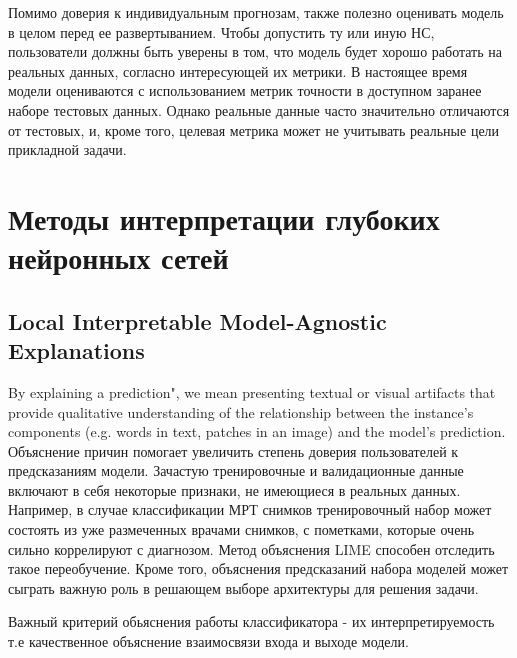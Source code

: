 \documentclass[oneside,final,14pt]{extreport}
\begin{document}
Помимо доверия к индивидуальным прогнозам, также полезно оценивать модель в целом перед ее развертыванием. Чтобы допустить ту или иную НС, пользователи должны быть уверены в том, что модель будет хорошо работать на реальных данных, согласно интересующей их метрики. В настоящее время модели оцениваются с использованием метрик точности в доступном заранее наборе тестовых данных. Однако реальные данные часто значительно отличаются от тестовых, и, кроме того, целевая метрика может не учитывать реальные цели прикладной задачи.
\section{Методы интерпретации глубоких нейронных сетей}
\subsection{Local Interpretable Model-Agnostic Explanations}
By explaining a prediction", we mean presenting textual or visual artifacts that provide qualitative understanding of the relationship between the instance’s components (e.g. words in text, patches in an image) and the model’s prediction. Объяснение причин помогает увеличить степень доверия пользователей к предсказаниям модели. Зачастую тренировочные и валидационные данные включают в себя некоторые признаки, не имеющиеся в реальных данных. Например, в случае классификации МРТ снимков тренировочный набор может состоять из уже размеченных врачами снимков, с пометками, которые очень сильно коррелируют с диагнозом. Метод объяснения LIME способен отследить такое переобучение. Кроме того, объяснения предсказаний набора моделей может сыграть важную роль в решающем выборе архитектуры для решения задачи. 

Важный критерий обьяснения работы классификатора - их интерпретируемость т.е качественное объяснение взаимосвязи входа и выходе модели.
\end{document}
